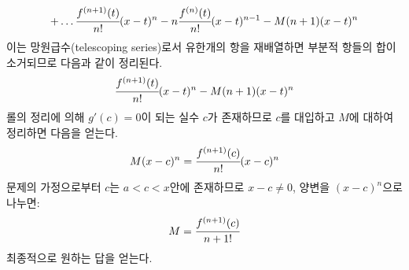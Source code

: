 \documentclass{article}
\begin{document}
\begin{equation}
+\dots \cfrac{f^{(n+1)}(t)}{n!}(x-t)^n-n\cfrac{f^{(n)}(t)}{n!}(x-t)^{n-1}-M(n+1)(x-t)^n
\end{equation}
이는 망원급수(telescoping series)로서 유한개의 항을 재배열하면 부분적 항들의 합이 소거되므로 다음과 같이 정리된다.
\begin{equation}
\cfrac{f^{(n+1)}(t)}{n!}(x-t)^n-M(n+1)(x-t)^n
\end{equation}
롤의 정리에 의해 $g'(c)=0$이 되는 실수 $c$가 존재하므로 $c$를 대입하고 $M$에 대하여 정리하면 다음을 얻는다.
\begin{equation}
M(x-c)^n=\cfrac{f^{(n+1)}(c)}{n!}(x-c)^n
\end{equation}
문제의 가정으로부터 $c$는 $a<c<x$안에 존재하므로 $x-c \neq0$, 양변을 $(x-c)^n$으로 나누면:
\begin{equation}
M=\cfrac{f^{(n+1)}(c)}{n+1!}
\end{equation}
최종적으로 원하는 답을 얻는다.
\end{document}
